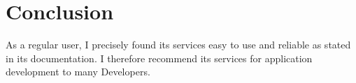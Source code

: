 \documentclass[options]{article}
\begin{document}
\section{Conclusion}
As a regular user, I precisely found its services  easy to use and reliable as stated in its documentation\cite{bettinson2017developing}. I therefore recommend its services for application development to many Developers.


\newpage


\end{document}
